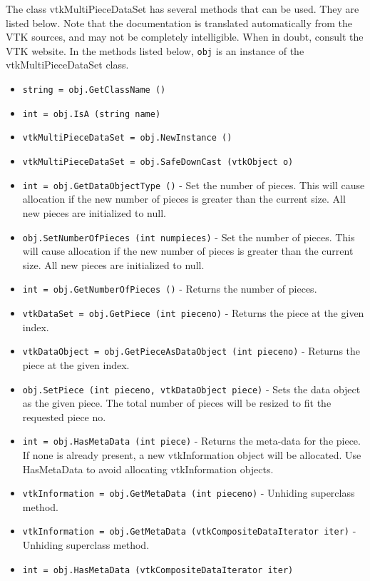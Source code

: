 The class vtkMultiPieceDataSet has several methods that can be used.
  They are listed below.
Note that the documentation is translated automatically from the VTK sources,
and may not be completely intelligible.  When in doubt, consult the VTK website.
In the methods listed below, \verb|obj| is an instance of the vtkMultiPieceDataSet class.
\begin{itemize}
\item  \verb|string = obj.GetClassName ()|

\item  \verb|int = obj.IsA (string name)|

\item  \verb|vtkMultiPieceDataSet = obj.NewInstance ()|

\item  \verb|vtkMultiPieceDataSet = obj.SafeDownCast (vtkObject o)|

\item  \verb|int = obj.GetDataObjectType ()| -  Set the number of pieces. This will cause allocation if the new number of
 pieces is greater than the current size. All new pieces are initialized to
 null.

\item  \verb|obj.SetNumberOfPieces (int numpieces)| -  Set the number of pieces. This will cause allocation if the new number of
 pieces is greater than the current size. All new pieces are initialized to
 null.

\item  \verb|int = obj.GetNumberOfPieces ()| -  Returns the number of pieces.

\item  \verb|vtkDataSet = obj.GetPiece (int pieceno)| -  Returns the piece at the given index. 

\item  \verb|vtkDataObject = obj.GetPieceAsDataObject (int pieceno)| -  Returns the piece at the given index. 

\item  \verb|obj.SetPiece (int pieceno, vtkDataObject piece)| -  Sets the data object as the given piece. The total number of pieces will 
 be resized to fit the requested piece no.

\item  \verb|int = obj.HasMetaData (int piece)| -  Returns the meta-data for the piece. If none is already present, a new
 vtkInformation object will be allocated. Use HasMetaData to avoid
 allocating vtkInformation objects.

\item  \verb|vtkInformation = obj.GetMetaData (int pieceno)| -  Unhiding superclass method.

\item  \verb|vtkInformation = obj.GetMetaData (vtkCompositeDataIterator iter)| -  Unhiding superclass method.

\item  \verb|int = obj.HasMetaData (vtkCompositeDataIterator iter)|

\end{itemize}
